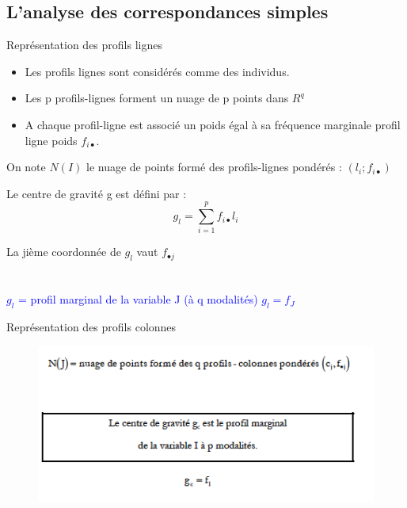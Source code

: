 \documentclass[11pt]{beamer}
\begin{document}
\subsection{L'analyse des correspondances simples}
 

\begin{frame}{Représentation des profils lignes}
\begin{itemize}
\item Les profils lignes sont considérés comme des individus.\\
\item Les p profils-lignes forment un nuage de p points dans $R^q$\\

\item A chaque profil-ligne est associé un poids égal à sa fréquence marginale profil ligne poids
$f_{i \bullet}$.
\end{itemize}
On note $N(I)$ le nuage de points formé des profils-lignes pondérés :
$( l_i; f_{i \bullet})$

Le centre de gravité g est défini par : $$ g_l=\sum_{i=1}^p f_{i \bullet}l_i$$

La jième coordonnée de $g_l$ vaut $f_{\bullet j}$\\~\\~\\

\textcolor{blue}{$g_l$ = profil marginal de la variable J (à q modalités) $g_l=f_J$}

\end{frame}
\begin{frame}{Représentation des profils colonnes}
\begin{figure}
\includegraphics[scale=0.7]{exemple10.png}  
\end{figure}
\end{frame}
\end{document}
